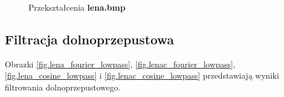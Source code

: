 \documentclass{classrep}
\begin{document}
\begin{figure}
{  \label{fig.lena_fourier_magnitude}
 }
\caption{Przekształcenia \textbf{lena.bmp}}
\end{figure}

\subsection{Filtracja dolnoprzepustowa}
Obrazki \ref{fig.lena_fourier_lowpass}, \ref{fig.lenac_fourier_lowpass}, \ref{fig.lena_cosine_lowpass} i \ref{fig.lenac_cosine_lowpass} przedstawiają wyniki filtrowania dolnoprzepustowego.
\end{document}
